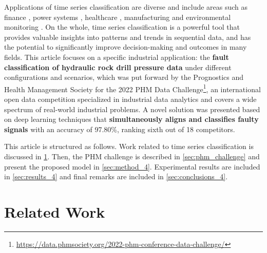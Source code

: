 Applications of time series classification are diverse and include areas such as finance \cite{majumdar2020clustering}, power systems \cite{susto2018time}, healthcare \cite{wang2022multihead}, manufacturing \cite{hsu2021multiple} and environmental monitoring \cite{gundersen2020binary}. On the whole, time series classification is a powerful tool that provides valuable insights into patterns and trends in sequential data, and has the potential to significantly improve decision-making and outcomes in many fields. 
This article focuses on a specific industrial application: the \textbf{fault classification of hydraulic rock drill pressure data} under different configurations and scenarios, which was put forward by the Prognostics and Health Management Society \cite{phm} for the 2022 PHM Data Challenge\footnote{\url{https://data.phmsociety.org/2022-phm-conference-data-challenge/}}, an international open data competition specialized in industrial data analytics and covers a wide spectrum of real-world industrial problems. %
A novel solution was presented based on deep learning techniques that \textbf{simultaneously aligns and classifies faulty signals} with an accuracy of 97.80\%, ranking sixth out of 18 competitors.


This article is structured as follows.
Work related to time series classification is discussed in \cref{sec:related_work_4}. Then, the PHM challenge is described in \cref{sec:phm_challenge} and present the proposed model in \cref{sec:method_4}. Experimental results are included in \cref{sec:results_4} and final remarks are included in \cref{sec:conclusions_4}.

\clearpage

\section{Related Work}\label{sec:related_work_4}

